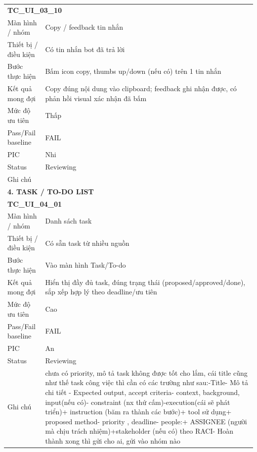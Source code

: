 \documentclass[12pt,a4paper]{article}
\begin{document}
\begin{longtable}{p{3.0cm}p{11.5cm}}
\multicolumn{2}{l}{\textbf{TC\_UI\_03\_10}} \\
Màn hình / nhóm & Copy / feedback tin nhắn \\
Thiết bị / điều kiện & Có tin nhắn bot đã trả lời \\
Bước thực hiện & Bấm icon copy, thumbs up/down (nếu có) trên 1 tin nhắn \\
Kết quả mong đợi & Copy đúng nội dung vào clipboard; feedback ghi nhận được, có phản hồi visual xác nhận đã bấm \\
Mức độ ưu tiên & Thấp \\
Pass/Fail baseline & FAIL \\
PIC & Nhi \\
Status & Reviewing \\
Ghi chú &  \\
\midrule
\multicolumn{2}{l}{\textbf{4. TASK / TO-DO LIST}} \\ \midrule
\multicolumn{2}{l}{\textbf{TC\_UI\_04\_01}} \\
Màn hình / nhóm & Danh sách task \\
Thiết bị / điều kiện & Có sẵn task từ nhiều nguồn \\
Bước thực hiện & Vào màn hình Task/To-do \\
Kết quả mong đợi & Hiển thị đầy đủ task, đúng trạng thái (proposed/approved/done), sắp xếp hợp lý theo deadline/ưu tiên \\
Mức độ ưu tiên & Cao \\
Pass/Fail baseline & FAIL \\
PIC & An \\
Status & Reviewing \\
Ghi chú & chưa có priority, mô tả task không được tốt cho lắm, cái title cũng như thế\newline \newline 1 task công việc thì cần có các trường như sau:\newline -Title\newline - Mô tả chi tiết \newline - Expected output, accept criteria\newline - context, background, input(nếu có)\newline - constraint (nx thứ cấm)\newline -execution(cái sẽ phát triển)\newline + instruction (băm ra thành các bước)\newline + tool sử dụng\newline + proposed method\newline - priority , deadline\newline \newline - people:\newline + ASSIGNEE (người mà chịu trách nhiệm)\newline +stakeholder (nếu có) theo RACI\newline - Hoàn thành xong thì gửi cho ai, gửi vào nhóm nào \\

\end{longtable}
\end{document}
